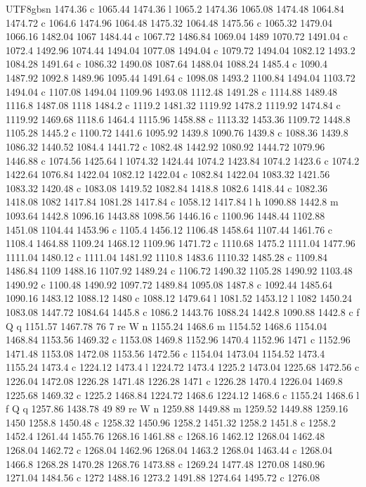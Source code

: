 \documentclass[11pt,a4paper,oneside]{report}
\begin{document}
\begin{CJK*}{UTF8}{gbsn}
{1474.36 c 1065.44 1474.36 l 1065.2 1474.36 1065.08 1474.48 1064.84 1474.72 c 1064.6 1474.96 1064.48
1475.32 1064.48 1475.56 c 1065.32 1479.04 1066.16 1482.04 1067 1484.44 c 1067.72 1486.84 1069.04 1489
1070.72 1491.04 c 1072.4 1492.96 1074.44 1494.04 1077.08 1494.04 c 1079.72 1494.04 1082.12 1493.2 1084.28
1491.64 c 1086.32 1490.08 1087.64 1488.04 1088.24 1485.4 c 1090.4 1487.92 1092.8 1489.96 1095.44 1491.64
c 1098.08 1493.2 1100.84 1494.04 1103.72 1494.04 c 1107.08 1494.04 1109.96 1493.08 1112.48 1491.28 c
1114.88 1489.48 1116.8 1487.08 1118 1484.2 c 1119.2 1481.32 1119.92 1478.2 1119.92 1474.84 c 1119.92
1469.68 1118.6 1464.4 1115.96 1458.88 c 1113.32 1453.36 1109.72 1448.8 1105.28 1445.2 c 1100.72 1441.6
1095.92 1439.8 1090.76 1439.8 c 1088.36 1439.8 1086.32 1440.52 1084.4 1441.72 c 1082.48 1442.92 1080.92
1444.72 1079.96 1446.88 c 1074.56 1425.64 l 1074.32 1424.44 1074.2 1423.84 1074.2 1423.6 c 1074.2 1422.64
1076.84 1422.04 1082.12 1422.04 c 1082.84 1422.04 1083.32 1421.56 1083.32 1420.48 c 1083.08 1419.52
1082.84 1418.8 1082.6 1418.44 c 1082.36 1418.08 1082 1417.84 1081.28 1417.84 c 1058.12 1417.84 l h
1090.88 1442.8 m 1093.64 1442.8 1096.16 1443.88 1098.56 1446.16 c 1100.96 1448.44 1102.88 1451.08 1104.44
1453.96 c 1105.4 1456.12 1106.48 1458.64 1107.44 1461.76 c 1108.4 1464.88 1109.24 1468.12 1109.96 1471.72
c 1110.68 1475.2 1111.04 1477.96 1111.04 1480.12 c 1111.04 1481.92 1110.8 1483.6 1110.32 1485.28 c
1109.84 1486.84 1109 1488.16 1107.92 1489.24 c 1106.72 1490.32 1105.28 1490.92 1103.48 1490.92 c 1100.48
1490.92 1097.72 1489.84 1095.08 1487.8 c 1092.44 1485.64 1090.16 1483.12 1088.12 1480 c 1088.12 1479.64 l
1081.52 1453.12 l 1082 1450.24 1083.08 1447.72 1084.64 1445.8 c 1086.2 1443.76 1088.24 1442.8 1090.88
1442.8 c f Q q 1151.57 1467.78 76 7 re W n 1155.24 1468.6 m 1154.52 1468.6 1154.04 1468.84 1153.56
1469.32 c 1153.08 1469.8 1152.96 1470.4 1152.96 1471 c 1152.96 1471.48 1153.08 1472.08 1153.56 1472.56 c
1154.04 1473.04 1154.52 1473.4 1155.24 1473.4 c 1224.12 1473.4 l 1224.72 1473.4 1225.2 1473.04 1225.68
1472.56 c 1226.04 1472.08 1226.28 1471.48 1226.28 1471 c 1226.28 1470.4 1226.04 1469.8 1225.68 1469.32 c
1225.2 1468.84 1224.72 1468.6 1224.12 1468.6 c 1155.24 1468.6 l f Q q 1257.86 1438.78 49 89 re W n
1259.88 1449.88 m 1259.52 1449.88 1259.16 1450 1258.8 1450.48 c 1258.32 1450.96 1258.2 1451.32 1258.2
1451.8 c 1258.2 1452.4 1261.44 1455.76 1268.16 1461.88 c 1268.16 1462.12 1268.04 1462.48 1268.04 1462.72
c 1268.04 1462.96 1268.04 1463.2 1268.04 1463.44 c 1268.04 1466.8 1268.28 1470.28 1268.76 1473.88 c
1269.24 1477.48 1270.08 1480.96 1271.04 1484.56 c 1272 1488.16 1273.2 1491.88 1274.64 1495.72 c 1276.08
}
\end{CJK*}
\end{document}
